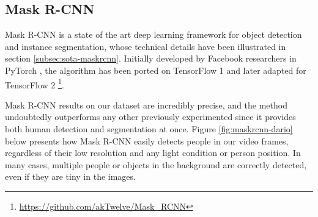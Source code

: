 


\subsection{Mask R-CNN}
\label{subsec:masking-maskrcnn}

Mask R-CNN \cite{he2018mask} is a state of the art deep learning framework for object detection and instance segmentation, whose technical details have been illustrated in section \ref{subsec:sota-maskrcnn}. Initially developed by Facebook researchers in PyTorch \cite{pytorch}, the algorithm has been ported on TensorFlow 1 \cite{MaskRCNN_matterport} and later adapted for TensorFlow 2 \cite{MaskRCNN_akTwelve}\footnote{\url{https://github.com/akTwelve/Mask_RCNN}}.

\medskip

Mask R-CNN results on our dataset are incredibly precise, and the method undoubtedly outperforms any other previously experimented since it provides both human detection and segmentation at once. Figure \ref{fig:maskrcnn-dario} below presents how Mask R-CNN easily detects people in our video frames, regardless of their low resolution and any light condition or person position. In many cases, multiple people or objects in the background are correctly detected, even if they are tiny in the images.

